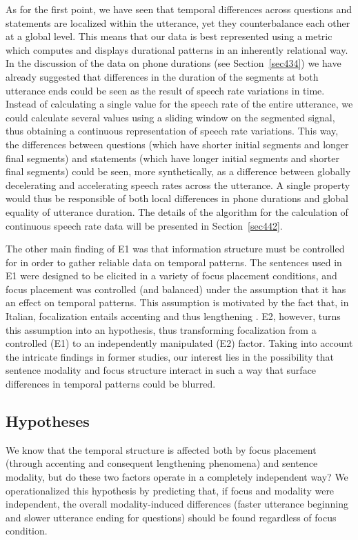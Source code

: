 As for the first point, we have seen that temporal differences across questions and statements are localized within the utterance, yet they counterbalance each other at a global level. This means that our data is best represented using a metric which computes and displays durational patterns in an inherently relational way. In the discussion of the data on phone durations (see Section~\ref{sec434}) we have already suggested that differences in the duration of the segments at both utterance ends could be seen as the result of speech rate variations in time. Instead of calculating a single value for the speech rate of the entire utterance, we could calculate several values using a sliding window on the segmented signal, thus obtaining a continuous representation of speech rate variations. This way, the differences between questions (which have shorter initial segments and longer final segments) and statements (which have longer initial segments and shorter final segments) could be seen, more synthetically, as a difference between globally decelerating and accelerating speech rates across the utterance. A single property would thus be responsible of both local differences in phone durations and global equality of utterance duration. The details of the algorithm for the calculation of continuous speech rate data will be presented in Section~\ref{sec442}.

The other main finding of E1 was that information structure must be controlled for in order to gather reliable data on temporal patterns. The sentences used in E1 were designed to be elicited in a variety of focus placement conditions, and focus placement was controlled (and balanced) under the assumption that it has an effect on temporal patterns. This assumption is motivated by the fact that, in Italian, focalization entails accenting and thus lengthening \citep{farnetani1990rhytmic}. E2, however, turns this assumption into an hypothesis, thus transforming focalization from a controlled (E1) to an independently manipulated (E2) factor. Taking into account the intricate findings in former studies, our interest lies in the possibility that sentence modality and focus structure interact in such a way that surface differences in temporal patterns could be blurred.

\subsection{Hypotheses}\label{sec441}
We know that the temporal structure is affected both by focus placement (through accenting and consequent lengthening phenomena) and sentence modality, but do these two factors operate in a completely independent way? We operationalized this hypothesis by predicting that, if focus and modality were independent, the overall modality-induced differences (faster utterance beginning and slower utterance ending for questions) should be found regardless of focus condition. 

